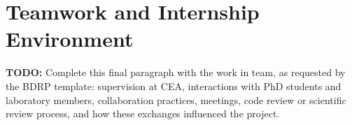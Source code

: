 \section{Teamwork and Internship Environment}

\textbf{TODO:} Complete this final paragraph with the work in team, as requested by the BDRP template: supervision at CEA, interactions with PhD students and laboratory members, collaboration practices, meetings, code review or scientific review process, and how these exchanges influenced the project.
